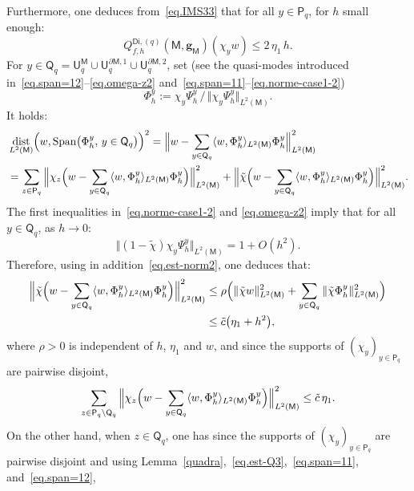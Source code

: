 \documentclass[JEP,XML,SOM,Unicode,NoEqCountersInSection,NoFloatCountersInSection,published]{cedram}
\DeclareMathOperator{\dist}{dist}
\DeclareMathOperator{\Span}{Span}
\newcommand{\mbf}[1]{\mathbf{#1}}
\let\lp\langle
\let\rp\rangle
\let\pa\partial
\theoremstyle{plain}
\theoremstyle{definition}
\begin{document}
Furthermore, one deduces from~\eqref{eq.IMS33} that for all $y\in \mathsf P_q$, for $h$ small enough:
\begin{equation}\label{eq.est-Q3}
Q_{f,h}^{\mathsf{Di},(q)}(\mathsf M,\mbf g_{\mathsf M})(\chi_y w) \le 2\, \eta_1\, h.
\end{equation}
For $y\in \mathsf Q_q= \mathsf U_q^{\mathsf M}\cup \mathsf U^{\pa
\mathsf M,1}_q\cup \mathsf U^{\pa \mathsf M,2}_q$, set (see the
quasi-modes introduced in~\eqref{eq.span=12}--\eqref{eq.omega-z2} and~\eqref{eq.span=11}--\eqref{eq.norme-case1-2})
\begin{equation}\label{eq.PHIY}
\Phi_h^y:= \chi_y\Psi_h^y\, /\, \Vert \chi_y \Psi_h^y \Vert_{L^2(\mathsf M)}.
\end{equation}
It holds:
\begin{align*}
&\dist_{L^2(\mathsf M)}\Bigl(w, \Span \bigl(\Phi_h^y, \, y\in \mathsf Q_q \bigr) \Bigr)^2= \Big \Vert w- \sum_{y \in \mathsf Q_q} \lp w, \Phi_h^y\rp _{L^2(\mathsf M)} \Phi_h^y \Big \Vert_{L^2(\mathsf M)}^2\\
&= \sum_{z\in \mathsf P_q}\Big \Vert \chi_z\Bigl(w- \sum_{y
\in \mathsf Q_q} \lp w, \Phi_h^y\rp _{L^2(\mathsf M)} \Phi_h^y\Bigr) \Big \Vert_{L^2(\mathsf M)}^2 +\Big\Vert \tilde \chi\Bigl(w- \sum_{y \in \mathsf Q_q} \lp w, \Phi_h^y\rp _{L^2(\mathsf M)} \Phi_h^y\Bigr) \Big\Vert_{L^2(\mathsf M)}^2.
\end{align*}
The first inequalities in~\eqref{eq.norme-case1-2} and \eqref{eq.omega-z2} imply that for all $y\in \mathsf Q_q$, as $h\to 0$:
\[
\Vert (1-\tilde \chi)\chi_y \Psi_h^y \Vert_{L^2(\mathsf M)} =1+O (h^{2}).
\]
Therefore, using in addition~\eqref{eq.est-norm2}, one deduces that:
\[
\begin{aligned}\Big\Vert \tilde \chi\Bigl(w- \sum_{y \in
\mathsf Q_q} \lp w, \Phi_h^y\rp _{L^2(\mathsf M)}
\Phi_h^y\Bigr) \Big\Vert_{L^2(\mathsf M)}^2 &\le \rho \Bigl(\Vert\tilde \chi w \Vert_{L^2(\mathsf M)}^2 + \sum_{y \in
\mathsf Q_q} \Vert\tilde \chi \Phi_h^y \Vert_{L^2(\mathsf
M)}^2 \Bigr)\\
&\le \tilde c \bigl(\eta_1 +h^2\bigr),
\end{aligned}
\]
where $\rho>0$ is independent of $h$, $\eta_1$ and $w$,
and since the supports of $(\chi_y)_{y\in \mathsf P_q}$ are pairwise disjoint,
\[
\sum_{z\in \mathsf P_q\setminus \mathsf Q_q}\Big \Vert \chi_z\Bigl(w- \sum_{y \in \mathsf Q_q} \lp w, \Phi_h^y\rp _{L^2(\mathsf M)} \Phi_h^y\Bigr) \Big \Vert_{L^2(\mathsf M)}^2 \le \tilde c\, \eta_1.
\]
On the other hand, when $z\in \mathsf Q_q$, one has since the supports of $(\chi_y)_{y\in \mathsf P_q}$ are pairwise disjoint and using Lemma~\ref{quadra},~\eqref{eq.est-Q3},~\eqref{eq.span=11}, and~\eqref{eq.span=12},
\end{document}
